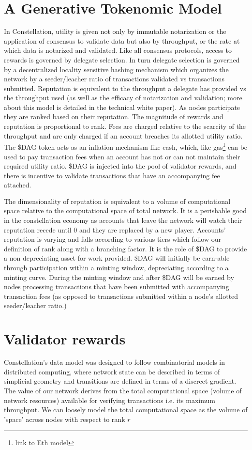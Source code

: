 \documentclass{article}
\begin{document}
\section{A Generative Tokenomic Model}
In Constellation, utility is given not only by immutable notarization or the application of consensus to validate data but also by throughput, or the rate at which data is notarized and validated. Like all consensus protocols, access to rewards is governed by delegate selection. In turn delegate selection is governed by a decentralized locality sensitive hashing mechanism which organizes the network by a seeder/leacher ratio of transactions validated vs transactions submitted. Reputation is equivalent to the throughput a delegate has provided vs the throughput used (as well as the efficacy of notarization and validation; more about this model is detailed in the technical white paper). As nodes participate they are ranked based on their reputation. The magnitude of rewards and reputation is proportional to rank. Fees are charged relative to the scarcity of the throughput and are only charged if an account breaches its allotted utility ratio. The \$DAG token acts as an inflation mechanism like cash, which, like gas\footnote{link to Eth model} can be used to pay transaction fees when an account has not or can not maintain their required utility ratio. \$DAG is injected into the pool of validator rewards, and there is incentive to validate transactions that have an accompanying fee attached. 

The dimensionality of reputation is equivalent to a volume of computational space relative to the computational space of total network. It is a perishable good in the constellation economy as accounts that leave the network will watch their reputation recede until 0 and they are replaced by a new player. Accounts' reputation is varying and falls according to various tiers which follow our definition of rank along with a branching factor. It is the role of \$DAG to provide a non depreciating asset for work provided. \$DAG will initially be earn-able through participation within a minting window, depreciating according to a minting curve. During the minting window and after  \$DAG will be earned by nodes processing transactions that have been submitted with accompanying transaction fees (as opposed to transactions submitted within a node's allotted seeder/leacher ratio.)

\section{Validator rewards}
Constellation's data model was designed to follow combinatorial models in distributed computing, where network state can be described in terms of simplicial geometry and transitions are defined in terms of a discreet gradient. The value of our network derives from the total computational space (volume of network resources) available for verifying transactions i.e. its maximum throughput. We can loosely model the total computational space as the volume of 'space' across nodes with respect to rank $r$
\end{document}
